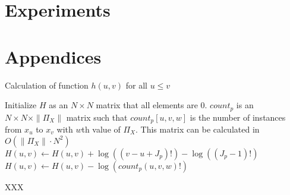 
\section{Experiments}
\label{sec:experiments}









\section*{Appendices}

\begin{algorithm}
\caption{ Calculation of function $h(u,v)$ for all $u \leq v$}
\label{alg:h}
\begin{algorithmic}[1]
\State Initialize $H$ as an $N \times N$ matrix that all elements are 0.
\State $count_p$ is an $N \times N \times \|\Pi_X\|$ matrix such that $count_p [u,v,w]$ is the number of instances from $x_u$ to $x_v$ with $w$th value of $\Pi_X$. This matrix can be calculated in $O(\|\Pi_X\| \cdot N^2)$
\State $H(u,v) \leftarrow H(u,v) + \log((v-u + J_p)!) - \log((J_p -1)!)$
\State $H(u,v) \leftarrow H(u,v) - \log( count_p(u,v,w)!)$
\EndFor
\EndFor
\EndFor

\State XXX
\EndFor
\end{algorithmic}
\end{algorithm}



